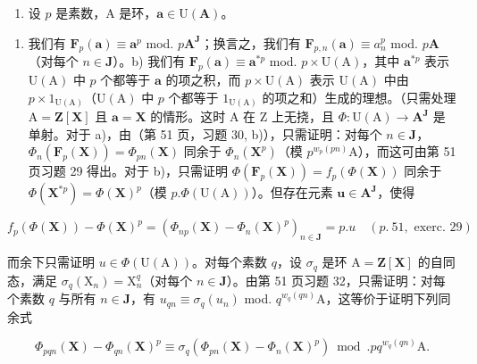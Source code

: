 \begin{enumerate}
\def\labelenumi{\arabic{enumi})}
\setcounter{enumi}{37}
\tightlist
\item
  设 \(p\) 是素数，A 是环，\(\pmb{a} \in \mathrm{U}(\mathbf{A})\)。
\end{enumerate}

\begin{enumerate}
\def\labelenumi{\alph{enumi})}
\tightlist
\item
  我们有 \(\mathbf{F}_p(\boldsymbol{a}) \equiv \boldsymbol{a}^p\) mod. \(p\mathbf{A}^\mathbf{J}\)；换言之，我们有 \(\mathbf{F}_{p,n}(\boldsymbol{a}) \equiv a_n^p\) mod. \(p\mathbf{A}\)（对每个 \(n \in \mathbf{J}\)）。b) 我们有 \(\mathbf{F}_p(\boldsymbol{a}) \equiv \boldsymbol{a}^{*p}\) mod. \(p \times \mathrm{U(A)}\)，其中 \(\boldsymbol{a}^{*p}\) 表示 \(\mathrm{U(A)}\) 中 \(p\) 个都等于 \(\boldsymbol{a}\) 的项之积，而 \(p \times \mathrm{U(A)}\) 表示 \(\mathrm{U(A)}\) 中由 \(p \times 1_{\mathrm{U(A)}}\)（\(\mathrm{U(A)}\) 中 \(p\) 个都等于 \(1_{\mathrm{U(A)}}\) 的项之和）生成的理想。（只需处理 \(\mathrm{A} = \mathbf{Z}[\mathbf{X}]\) 且 \(\boldsymbol{a} = \mathbf{X}\) 的情形。这时 A 在 Z 上无挠，且 \(\Phi: \mathrm{U(A)} \to \mathbf{A}^\mathbf{J}\) 是单射。对于 a)，由（第 51 页，习题 30, b)），只需证明：对每个 \(n \in \mathbf{J}\)，\(\Phi_n(\mathbf{F}_p(\mathbf{X})) = \Phi_{pn}(\mathbf{X})\) 同余于 \(\Phi_n(\mathbf{X}^p)\)（模 \(p^{w_p(pn)}\mathrm{A}\)），而这可由第 51 页习题 29 得出。对于 b)，只需证明 \(\Phi(\mathbf{F}_p(\mathbf{X})) = f_p(\Phi(\mathbf{X}))\) 同余于 \(\Phi(\mathbf{X}^{*p}) = \Phi(\mathbf{X})^p\)（模 \(p.\Phi(\mathrm{U(A)})\)）。但存在元素 \(\boldsymbol{u} \in \mathbf{A}^\mathbf{J}\)，使得
\end{enumerate}

\[
f _ {p} (\Phi (\mathbf {X})) - \Phi (\mathbf {X}) ^ {p} = \left(\Phi_ {n p} (\mathbf {X}) - \Phi_ {n} (\mathbf {X}) ^ {p}\right) _ {n \in \mathbf {J}} = p. u \quad (p.~51, \text { exerc. } 2 9)
\]

  而余下只需证明 \(u \in \Phi(\mathrm{U}(\mathrm{A}))\)。对每个素数 \(q\)，设 \(\sigma_q\) 是环 \(\mathrm{A} = \mathbf{Z}[\mathbf{X}]\) 的自同态，满足 \(\sigma_q(\mathrm{X}_n) = \mathrm{X}_n^q\)（对每个 \(n \in \mathbf{J}\)）。由第 51 页习题 32，只需证明：对每个素数 \(q\) 与所有 \(n \in \mathbf{J}\)，有 \(u_{qn} \equiv \sigma_q(u_n)\) mod. \(q^{w_q(qn)}\mathrm{A}\)，这等价于证明下列同余式

\[
\Phi_ {p q n} (\mathbf {X}) - \Phi_ {q n} (\mathbf {X}) ^ {p} \equiv \sigma_ {q} \left(\Phi_ {p n} (\mathbf {X}) - \Phi_ {n} (\mathbf {X}) ^ {p}\right) \bmod . p q ^ {w _ {q} (q n)} \mathrm{A}.\tag{1}
\]

